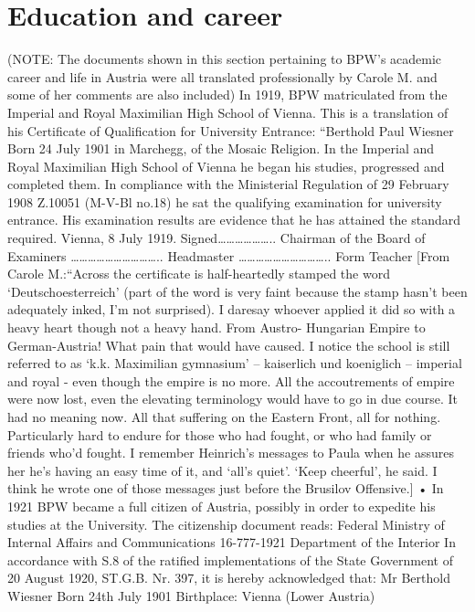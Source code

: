 \chapter{Education and career}

(NOTE: The documents shown in this section pertaining to BPW’s academic career and life in
Austria were all translated professionally by Carole M. and some of her comments are also
included)
In 1919, BPW matriculated from the Imperial and Royal Maximilian High School of Vienna. This is
a translation of his Certificate of Qualification for University Entrance:
“Berthold Paul Wiesner
Born 24 July 1901 in Marchegg, of the Mosaic Religion.
In the Imperial and Royal Maximilian High School of Vienna he began his studies, progressed and
completed them.
In compliance with the Ministerial Regulation of 29 February 1908 Z.10051 (M-V-Bl no.18) he sat
the qualifying examination for university entrance.
His examination results are evidence that he has attained the standard required.
Vienna, 8 July 1919.
Signed………………..
Chairman of the Board of Examiners
…………………………..
Headmaster
…………………………..
Form Teacher
[From Carole M.:“Across the certificate is half-heartedly stamped the word ‘Deutschoesterreich’
(part of the word is very faint because the stamp hasn’t been adequately inked, I’m not surprised).
I daresay whoever applied it did so with a heavy heart though not a heavy hand. From Austro-
Hungarian Empire to German-Austria! What pain that would have caused. I notice the school is
still referred to as ‘k.k. Maximilian gymnasium’ – kaiserlich und koeniglich – imperial and royal -
even though the empire is no more. All the accoutrements of empire were now lost, even the
elevating terminology would have to go in due course. It had no meaning now.
All that suffering on the Eastern Front, all for nothing. Particularly hard to endure for those who
had fought, or who had family or friends who’d fought. I remember Heinrich’s messages to Paula
when he assures her he’s having an easy time of it, and ‘all’s quiet’. ‘Keep cheerful’, he said. I
think he wrote one of those messages just before the Brusilov Offensive.]
•
In 1921 BPW became a full citizen of Austria, possibly in order to expedite his studies at the
University. The citizenship document reads:
Federal Ministry of Internal Affairs and Communications 16-777-1921 Department of the Interior
In accordance with S.8 of the ratified implementations of the State Government of 20 August 1920,
ST.G.B. Nr. 397, it is hereby acknowledged that: Mr Berthold Wiesner Born 24th July 1901
Birthplace: Vienna (Lower Austria)
